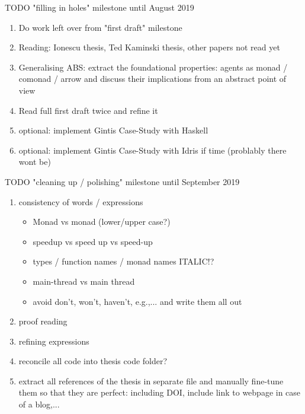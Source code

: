 \documentclass[oneside]{book}
\begin{document}
TODO "filling in holes" milestone until August 2019
\begin{enumerate}
	\item Do work left over from "first draft" milestone
	
	\item Reading: Ionescu thesis, Ted Kaminski thesis, other papers not read yet
	
	\item Generalising ABS: extract the foundational properties: agents as monad / comonad / arrow and discuss their implications from an abstract point of view

	\item Read full first draft twice and refine it
	
	\item optional: implement Gintis Case-Study with Haskell
	
	\item optional:  implement Gintis Case-Study with Idris if time (problably there wont be)
\end{enumerate}

TODO "cleaning up / polishing" milestone until September 2019
\begin{enumerate}
	\item consistency of words / expressions
		\begin{itemize}
			\item Monad vs monad (lower/upper case?)
			\item speedup vs speed up vs speed-up
			\item types / function names / monad names ITALIC!?
			\item main-thread vs main thread
			\item avoid don't, won't, haven't, e.g.,... and write them all out
		\end{itemize}
	\item proof reading

	\item refining expressions
	
	\item reconcile all code into thesis code folder?
	
	\item extract all references of the thesis in separate file and manually fine-tune them so that they are perfect: including DOI, include link to webpage in case of a blog,...
\end{enumerate}
\end{document}
